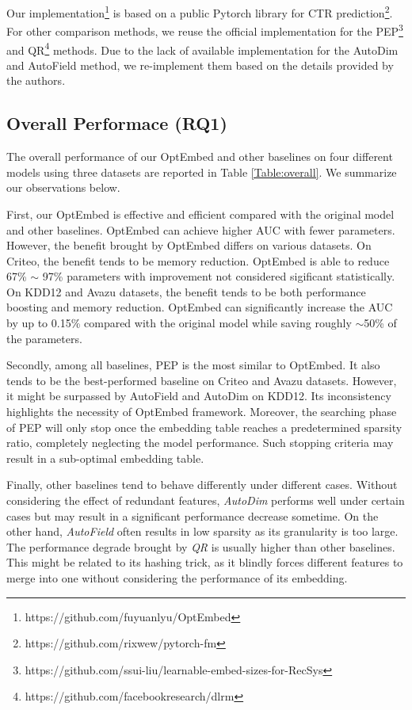 \documentclass[sigconf]{acmart}
\begin{document}
Our implementation\footnote{https://github.com/fuyuanlyu/OptEmbed} is based on a public Pytorch library for CTR prediction\footnote{https://github.com/rixwew/pytorch-fm}. For other comparison methods, we reuse the official implementation for the PEP\footnote{https://github.com/ssui-liu/learnable-embed-sizes-for-RecSys}\cite{PEP} and QR\footnote{https://github.com/facebookresearch/dlrm}\cite{QR} methods. Due to the lack of available implementation for the AutoDim\cite{AutoDim} and AutoField\cite{autofield} method, we re-implement them based on the details provided by the authors.








\subsection{Overall Performace (RQ1)}

The overall performance of our OptEmbed and other baselines on four different models using three datasets are reported in Table \ref{Table:overall}. We summarize our observations below.

First, our OptEmbed is effective and efficient compared with the original model and other baselines. OptEmbed can achieve higher AUC with fewer parameters. However, the benefit brought by OptEmbed differs on various datasets. On Criteo, the benefit tends to be memory reduction. OptEmbed is able to reduce 67\% $\sim$ 97\% parameters with improvement not considered sigificant statistically. On KDD12 and Avazu datasets, the benefit tends to be both performance boosting and memory reduction. OptEmbed can significantly increase the AUC by up to 0.15\% compared with the original model while saving roughly $\sim$50\% of the parameters.

Secondly, among all baselines, PEP is the most similar to OptEmbed. It also tends to be the best-performed baseline on Criteo and Avazu datasets. However, it might be surpassed by AutoField and AutoDim on KDD12. Its inconsistency highlights the necessity of OptEmbed framework. Moreover, the searching phase of PEP will only stop once the embedding table reaches a predetermined sparsity ratio, completely neglecting the model performance. Such stopping criteria may result in a sub-optimal embedding table.


Finally, other baselines tend to behave differently under different cases. Without considering the effect of redundant features, \textit{AutoDim} performs well under certain cases but may result in a significant performance decrease sometime. On the other hand, \textit{AutoField} often results in low sparsity as its granularity is too large. The performance degrade brought by \textit{QR} is usually higher than other baselines. This might be related to its hashing trick, as it blindly forces different features to merge into one without considering the performance of its embedding. 
\end{document}
